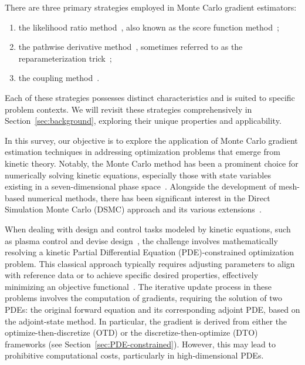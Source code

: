 \documentclass[12pt]{amsart}
\begin{document}
There are three primary strategies employed in Monte Carlo gradient estimators:
\begin{enumerate}
    \item the likelihood ratio method~\cite{glynn1990likelihood}, also known as the score function method~\cite{rubinstein1986score};
    \item  the pathwise derivative method~\cite{glasserman2013monte,glasserman1990gradient}, sometimes referred to as the reparameterization trick~\cite{kingma2013auto};
    \item the coupling method~\cite{pflug2012optimization,mohamed2019monte}.
\end{enumerate}
Each of these strategies possesses distinct characteristics and is suited to specific problem contexts. We will revisit these strategies comprehensively in Section~\ref{sec:background}, exploring their unique properties and applicability.



In this survey, our objective is to explore the application of Monte Carlo gradient estimation techniques in addressing optimization problems that emerge from kinetic theory. Notably, the Monte Carlo method has been a prominent choice for numerically solving kinetic equations, especially those with state variables existing in a seven-dimensional phase space~\cite{caflisch1980boltzmann}.  Alongside the development of mesh-based numerical methods, there has been significant interest in the Direct Simulation Monte Carlo (DSMC) approach and its various extensions~\cite{bird1970direct, nanbu1980direct, bobylev2000theory,pareschi2001introduction,pareschi2013interacting}. 

When dealing with design and control tasks modeled by kinetic equations, such as plasma control and devise design~\cite{einkemmer2023suppressing}, the challenge involves mathematically resolving a kinetic Partial Differential Equation (PDE)-constrained optimization problem. This classical approach typically requires adjusting parameters to align with reference data or to achieve specific desired properties, effectively minimizing an objective functional~\cite{hinze2008optimization}. The iterative update process in these problems involves the computation of gradients, requiring the solution of two PDEs: the original forward equation and its corresponding adjoint PDE, based on the adjoint-state method. In particular, the gradient is derived from either the optimize-then-discretize (OTD) or the discretize-then-optimize (DTO) frameworks (see Section~\ref{sec:PDE-constrained}). However, this may lead to prohibitive computational costs, particularly in high-dimensional PDEs.
\end{document}

